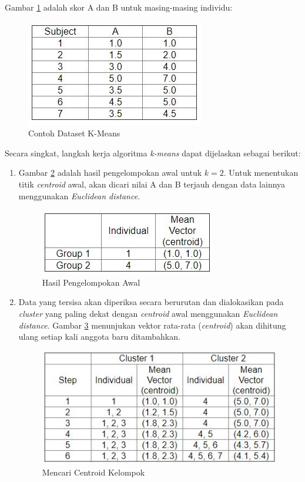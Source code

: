 \documentclass[a4paper,twoside]{article}
\begin{document}
\begin{enumerate}
\noindent Gambar \ref{fig:kmeans_1} adalah skor A dan B untuk masing-masing individu:

\begin{figure}[H]
	\centering
	\includegraphics[scale=0.9]{kmeans_1}
	\caption{Contoh Dataset K-Means}
	\label{fig:kmeans_1}
\end{figure}

\noindent Secara singkat, langkah kerja algoritma \textit{k-means} dapat dijelaskan sebagai berikut:
\begin{enumerate}

\item Gambar \ref{fig:kmeans_2} adalah hasil pengelompokan awal untuk $k = 2$. Untuk menentukan titik \textit{centroid} awal, akan dicari nilai A dan B terjauh dengan data lainnya menggunakan \textit{Euclidean distance}.

\begin{figure}[H]
	\centering
	\includegraphics[scale=0.9]{kmeans_2}
	\caption{Hasil Pengelompokan Awal}
	\label{fig:kmeans_2}
\end{figure}

\item Data yang tersisa akan diperiksa secara berurutan dan dialokasikan pada \textit{cluster} yang paling dekat dengan \textit{centroid} awal menggunakan \textit{Euclidean distance}. Gambar \ref{fig:kmeans_3} menunjukan vektor rata-rata (\textit{centroid}) akan dihitung ulang setiap kali anggota baru ditambahkan.

\begin{figure}[H]
	\centering
	\includegraphics[scale=0.9]{kmeans_3}
	\caption{Mencari Centroid Kelompok}
	\label{fig:kmeans_3}
\end{figure}


\end{enumerate}
\end{enumerate}
\end{document}
